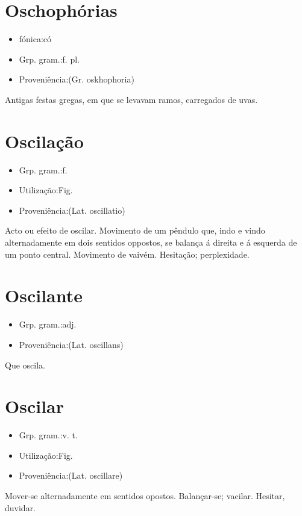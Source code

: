 \section{Oschophórias}
\begin{itemize}
\item {fónica:có}
\end{itemize}
\begin{itemize}
\item {Grp. gram.:f. pl.}
\end{itemize}
\begin{itemize}
\item {Proveniência:(Gr. \textunderscore oskhophoria\textunderscore )}
\end{itemize}
Antigas festas gregas, em que se levavam ramos, carregados de uvas.
\section{Oscilação}
\begin{itemize}
\item {Grp. gram.:f.}
\end{itemize}
\begin{itemize}
\item {Utilização:Fig.}
\end{itemize}
\begin{itemize}
\item {Proveniência:(Lat. \textunderscore oscillatio\textunderscore )}
\end{itemize}
Acto ou efeito de oscilar.
Movimento de um pêndulo que, indo e vindo alternadamente em dois sentidos oppostos, se balança á direita e á esquerda de um ponto central.
Movimento de vaivém.
Hesitação; perplexidade.
\section{Oscilante}
\begin{itemize}
\item {Grp. gram.:adj.}
\end{itemize}
\begin{itemize}
\item {Proveniência:(Lat. \textunderscore oscillans\textunderscore )}
\end{itemize}
Que oscila.
\section{Oscilar}
\begin{itemize}
\item {Grp. gram.:v. t.}
\end{itemize}
\begin{itemize}
\item {Utilização:Fig.}
\end{itemize}
\begin{itemize}
\item {Proveniência:(Lat. \textunderscore oscillare\textunderscore )}
\end{itemize}
Mover-se alternadamente em sentidos opostos.
Balançar-se; vacilar.
Hesitar, duvidar.
